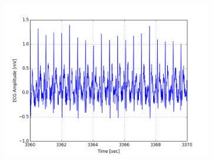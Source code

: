 \documentclass[paper=a4, fontsize=11pt]{scrartcl}
\numberwithin{equation}{section}		%
\numberwithin{figure}{section}			%
\numberwithin{table}{section}		    %
\begin{document}
\begin{appendices}
\begin{figure}[H]
\begin{subfigure}[b]{0.3\textwidth}
		\includegraphics[width=\textwidth]{sim/ecg_72}
	\end{subfigure}
\end{figure}


\end{appendices}
\end{document}
